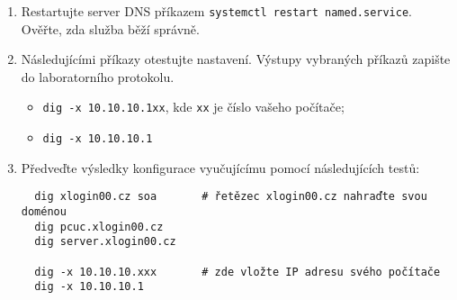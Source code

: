 \documentclass[a4paper,11pt]{article}
\begin{document}
\begin{enumerate}
  \item Restartujte server DNS příkazem {\tt systemctl restart named.service}. Ověřte, zda služba běží správně.

    \item Následujícími příkazy otestujte nastavení. Výstupy vybraných příkazů zapište do laboratorního protokolu.
    \begin{itemize}
        \item {\tt dig -x 10.10.10.1xx}, kde {\tt xx} je číslo vašeho počítače;
        \item {\tt dig -x 10.10.10.1}
    \end{itemize}

  \item Předveďte výsledky konfigurace vyučujícímu pomocí následujících testů:
\begin{verbatim}
  dig xlogin00.cz soa       # řetězec xlogin00.cz nahraďte svou doménou
  dig pcuc.xlogin00.cz
  dig server.xlogin00.cz

  dig -x 10.10.10.xxx       # zde vložte IP adresu svého počítače
  dig -x 10.10.10.1
\end{verbatim}



\end{enumerate}
\end{document}

